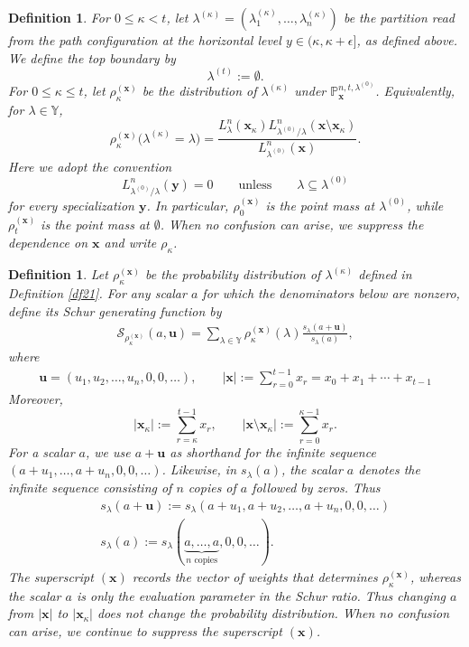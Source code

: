 \documentclass[11pt]{amsart}
\theoremstyle{plain}
\newtheorem{definition}[theorem]{Definition}
\newcommand\YY{{\mathbb {Y}}}
\numberwithin{equation}{section}
\numberwithin{theorem}{section}
\numberwithin{figure}{section}
\begin{document}
\begin{definition}
For $0\leq\kappa<t$, let
$\lambda^{(\kappa)}=(\lambda_1^{(\kappa)},\ldots,
\lambda_n^{(\kappa)})$ be the partition read from the path configuration at
the horizontal level $y\in(\kappa,\kappa+\epsilon]$, as defined above. We
define the top boundary by
\[
    \lambda^{(t)}:=\emptyset.
\]
For $0\leq\kappa\leq t$, let
$\rho_{\kappa}^{(\mathbf{x})}$ be the distribution of
$\lambda^{(\kappa)}$ under
$\mathbb{P}_{\mathbf{x}}^{n,t,\lambda^{(0)}}$. Equivalently, for
$\lambda\in\YY$,
\[
\rho_{\kappa}^{(\mathbf{x})}
\bigl(\lambda^{(\kappa)}=\lambda\bigr)
=
\frac{
L_{\lambda}^n(\mathbf{x}_{\kappa})
L_{\lambda^{(0)}/\lambda}^n
   (\mathbf{x}\setminus\mathbf{x}_{\kappa})
}{
L_{\lambda^{(0)}}^n(\mathbf{x})
}.
\]
Here we adopt the convention
\[
L_{\lambda^{(0)}/\lambda}^n(\mathbf{y})=0
\qquad\text{unless}\qquad
\lambda\subseteq\lambda^{(0)}
\]
for every specialization $\mathbf{y}$. In particular, $\rho_0^{(\mathbf{x})}$ is the point mass at
$\lambda^{(0)}$, while $\rho_t^{(\mathbf{x})}$ is the point mass at
$\emptyset$.
When no confusion can arise, we suppress the dependence on $\mathbf{x}$ and
write $\rho_{\kappa}$.
\end{definition}

\begin{definition}\label{df01}
Let $\rho_{\kappa}^{(\mathbf{x})}$ be the probability distribution of
$\lambda^{(\kappa)}$ defined in Definition \ref{df21}. For any scalar $a$
for which the denominators below are nonzero, define its Schur generating
function by
\begin{eqnarray*}
\mathcal{S}_{\rho_{\kappa}^{(\mathbf{x})}}(a,\mathbf{u})
=
\sum_{\lambda\in\YY}
\rho_{\kappa}^{(\mathbf{x})}(\lambda)
\frac{s_{\lambda}(a+\mathbf{u})}{s_{\lambda}(a)},
\end{eqnarray*}
where
\begin{align}
\mathbf{u}=(u_1,u_2,\ldots,u_n,0,0,\ldots),\qquad
|\mathbf{x}|:=\sum_{r=0}^{t-1}x_r=x_0+x_1+\cdots+x_{t-1}\label{dux}
\end{align}
Moreover,
\[
|\mathbf{x}_{\kappa}|:=\sum_{r=\kappa}^{t-1}x_r,
\qquad
|\mathbf{x}\setminus\mathbf{x}_{\kappa}|:=\sum_{r=0}^{\kappa-1}x_r.
\]
For a scalar $a$, we use $a+\mathbf{u}$ as shorthand for the infinite
sequence $(a+u_1,\ldots,a+u_n,0,0,\ldots)$. Likewise, in
$s_{\lambda}(a)$, the scalar $a$ denotes the infinite sequence consisting of
$n$ copies of $a$ followed by zeros. Thus
\begin{eqnarray}
&&s_{\lambda}(a+\mathbf{u})
:=s_{\lambda}(a+u_1,a+u_2,\ldots,a+u_n,0,0,\ldots)\label{sxu}\\
&&s_{\lambda}(a)
:=s_{\lambda}(\underbrace{a,\ldots,a}_{n\text{ copies}},0,0,\ldots).
\end{eqnarray}
The superscript $(\mathbf{x})$ records the vector of weights that determines
$\rho_{\kappa}^{(\mathbf{x})}$, whereas the scalar $a$ is only the evaluation
parameter in the Schur ratio. Thus changing $a$ from $|\mathbf{x}|$ to
$|\mathbf{x}_{\kappa}|$ does not change the probability distribution. When no
confusion can arise, we continue to suppress the superscript $(\mathbf{x})$.
\end{definition}
\end{document}

